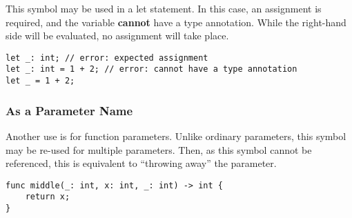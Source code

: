 This symbol may be used in a let statement.
In this case, an assignment is required, and the variable \textbf{cannot} have a type annotation.
While the right-hand side will be evaluated, no assignment will take place.

\begin{lstlisting}[language=CustomLang]
let _: int; // error: expected assignment
let _: int = 1 + 2; // error: cannot have a type annotation
let _ = 1 + 2;
\end{lstlisting}

\subsubsection{As a Parameter Name}

Another use is for function parameters.
Unlike ordinary parameters, this symbol may be re-used for multiple parameters.
Then, as this symbol cannot be referenced, this is equivalent to ``throwing away'' the parameter.

\begin{lstlisting}[language=CustomLang]
func middle(_: int, x: int, _: int) -> int {
    return x;
}
\end{lstlisting}
